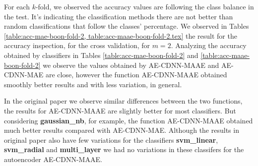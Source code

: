 For each $k$-fold, we observed the accuracy values are following the class balance in the test. It's indicating the classification methods there are not better than random classifications that follow the classes' percentage. We observed in Tables \ref{table:acc-mae-boon-fold-2, table:acc-maae-boon-fold-2.tex} the result for the accuracy inspection, for the cross validation, for $m = 2$. Analyzing the accuracy obtained by classifiers in Tables \ref{table:acc-mae-boon-fold-2} and \ref{table:acc-maae-boon-fold-2} we observe the values obtained by AE-CDNN-MAAE and AE-CDNN-MAE are close, however the function AE-CDNN-MAAE obtained smoothly better results and with less variation, in general.





In the original paper we observe similar differences between the two functions, the results for AE-CDNN-MAAE are slightly better for most classifiers. But considering \textbf{gaussian\_nb}, for example, the function AE-CDNN-MAAE obtained much better results compared with AE-CDNN-MAE. Although the results in original paper also have few variations for the classifiers \textbf{svm\_linear}, \textbf{svm\_radial} and \textbf{multi\_layer} we had no variations in these classifers for the autoencoder AE-CDNN-MAAE.

